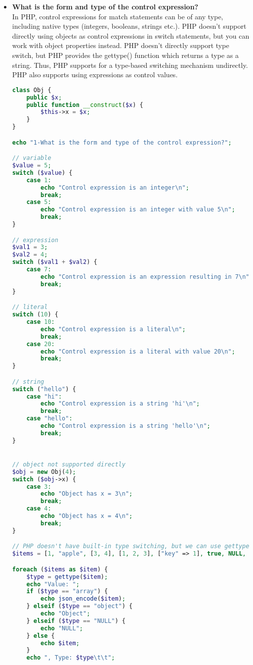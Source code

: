 \documentclass{article}
\begin{document}
\begin{itemize}
\item \textbf{What is the form and type of the control expression?} \\
In PHP, control expressions for match statements can be of any type, including native types (integers, booleans, strings etc.). PHP doesn't support directly using objects as control expressions in switch statements, but you can work with object properties instead. PHP doesn't directly support type switch, but PHP provides the gettype() function which returns a type as a string. Thus, PHP supports for a type-based switching mechanism undirectly. PHP also supports using expressions as control values.
\begin{lstlisting}[language=PHP]
class Obj {
    public $x;
    public function __construct($x) {
        $this->x = $x;
    }
}

echo "1-What is the form and type of the control expression?";

// variable
$value = 5;
switch ($value) {
    case 1:
        echo "Control expression is an integer\n";
        break;
    case 5:
        echo "Control expression is an integer with value 5\n";
        break;
}

// expression
$val1 = 3;
$val2 = 4;
switch ($val1 + $val2) {
    case 7:
        echo "Control expression is an expression resulting in 7\n";
        break;
}

// literal
switch (10) {
    case 10:
        echo "Control expression is a literal\n";
        break;
    case 20:
        echo "Control expression is a literal with value 20\n";
        break;
}

// string
switch ("hello") {
    case "hi":
        echo "Control expression is a string 'hi'\n";
        break;
    case "hello":
        echo "Control expression is a string 'hello'\n";
        break;
}


// object not supported directly
$obj = new Obj(4);
switch ($obj->x) {
    case 3:
        echo "Object has x = 3\n";
        break;
    case 4:
        echo "Object has x = 4\n";
        break;
}

// PHP doesn't have built-in type switching, but we can use gettype() for similar behavior
$items = [1, "apple", [3, 4], [1, 2, 3], ["key" => 1], true, NULL, new Obj(3)];

foreach ($items as $item) {
    $type = gettype($item);
    echo "Value: ";
    if ($type == "array") {
        echo json_encode($item);
    } elseif ($type == "object") {
        echo "Object";
    } elseif ($type == "NULL") {
        echo "NULL";
    } else {
        echo $item;
    }
    echo ", Type: $type\t\t";
    

\end{lstlisting}
\end{itemize}
\end{document}
